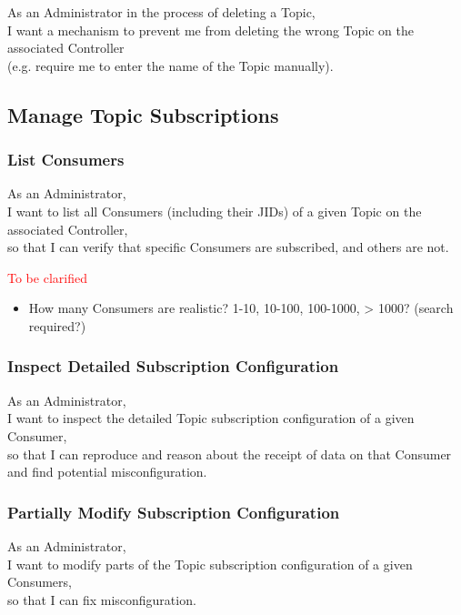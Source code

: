 As an Administrator in the process of deleting a Topic, \\
I want a mechanism to prevent me from deleting the wrong Topic on the associated Controller\\
(e.g. require me to enter the name of the Topic manually).

\subsection{Manage Topic Subscriptions}

\subsubsection{List Consumers}

As an Administrator, \\
I want to list all Consumers (including their JIDs) of a given Topic on the associated Controller, \\
so that I can verify that specific Consumers are subscribed, and others are not.

\noindent\textcolor{red}{To be clarified}

\begin{itemize}
    \item How many Consumers are realistic? 1-10, 10-100, 100-1000, > 1000? (search required?)
\end{itemize}


\subsubsection{Inspect Detailed Subscription Configuration}

As an Administrator, \\
I want to inspect the detailed Topic subscription configuration of a given Consumer, \\
so that I can reproduce and reason about the receipt of data on that Consumer
and find potential misconfiguration.

\subsubsection{Partially Modify Subscription Configuration}

As an Administrator, \\
I want to modify parts of the Topic subscription configuration of a given Consumers, \\
so that I can fix misconfiguration.

